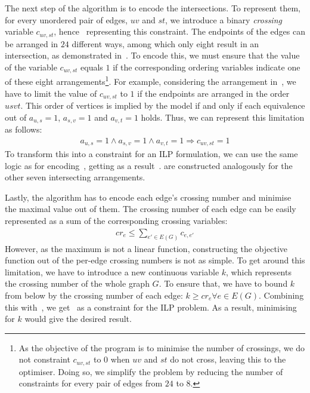 The next step of the algorithm is to encode the intersections. To represent them, for every unordered pair of edges, \(uv\) and \(st\), we introduce a binary \emph{crossing} variable \(c_{uv, st}\), hence~ representing this constraint. The endpoints of the edges can be arranged in \(24\) different ways, among which only eight result in an intersection, as demonstrated in~. To encode this, we must ensure that the value of the variable \(c_{uv, st}\) equals \(1\) if the corresponding ordering variables indicate one of these eight arrangements\footnote{As the objective of the program is to minimise the number of crossings, we do not constraint \(c_{uv, st}\) to \(0\) when \(uv\) and \(st\) do not cross, leaving this to the optimiser. Doing so, we simplify the problem by reducing the number of constraints for every pair of edges from \(24\) to \(8\).}. For example, considering the arrangement in~, we have to limit the value of \(c_{uv, st}\) to \(1\) if the endpoints are arranged in the order \(usvt\). This order of vertices is implied by the model if and only if each equivalence out of \(a_{u,s} = 1\), \(a_{s,v} = 1\) and \(a_{v,t} = 1\) holds. Thus, we can represent this limitation as follows:
\begin{align*}
    a_{u,s} = 1 \land a_{s,v} = 1 \land a_{v,t} = 1 \Longrightarrow c_{uv, st} = 1
\end{align*}
To transform this into a constraint for an ILP formulation, we can use the same logic as for encoding~, getting as a result~.  are constructed analogously for the other seven intersecting arrangements.

Lastly, the algorithm has to encode each edge's crossing number and minimise the maximal value out of them. The crossing number of each edge can be easily represented as a sum of the corresponding crossing variables:
\begin{align}
    \label{eq:ilp:crossing-number}
    cr_{e} \leqslant \sum_{e' \in E(G)} c_{e, e'}
\end{align}
However, as the maximum is not a linear function, constructing the objective function out of the per-edge crossing numbers is not as simple. To get around this limitation, we have to introduce a new continuous variable \(k\), which represents the crossing number of the whole graph \(G\). To ensure that, we have to bound \(k\) from below by the crossing number of each edge: \(k \geqslant cr_{e} \forall e \in E(G)\). Combining this with~, we get~ as a constraint for the ILP problem. As a result, minimising for \(k\) would give the desired result.

